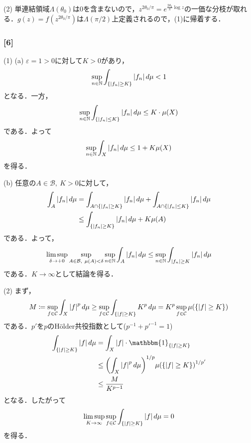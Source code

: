 \documentclass[a4j]{ltjsarticle}
\newcommand{\Nset}{\mathbb{N}}
\newcommand{\1}{\mathbbm{1}}
\numberwithin{equation}{section}
\theoremstyle{definition}
\begin{document}
(2) 単連結領域$\Lambda(\theta_0)$は$0$を含まないので，$z^{2\theta_0/\pi}=e^{\frac{2\theta_0}{\pi}\log z}$の一価な分枝が取れる．$g(z)=f(z^{2\theta_0/\pi})$は$\Lambda(\pi/2)$上定義されるので，(1)に帰着する．
\subsubsection*{[6]}
(1) (a) $\varepsilon=1>0$に対して$K>0$があり，
\begin{equation}
    \sup_{n\in\Nset}\int_{\qty{\abs{f_n}\geq K}}\abs{f_n}\,d\mu<1
\end{equation}
となる．一方，
\begin{equation}
    \sup_{n\in\Nset}\int_{\qty{\abs{f_n}\leq K}}\abs{f_n}\,d\mu\leq K\cdot\mu(X)
\end{equation}
である．よって
\begin{equation}
    \sup_{n\in\Nset}\int_{X}\abs{f_n}\,d\mu\leq 1+K\mu(X)
\end{equation}
を得る．

(b) 任意の$A\in\mathcal{B},\ K>0$に対して，
\begin{align}
    \int_{A}\abs{f_n}\,d\mu&=\int_{A\cap \qty{\abs{f_n}\geq K}}\abs{f_n}\,d\mu+\int_{A\cap\qty{\abs{f_n}\leq K}}\abs{f_n}\,d\mu\\
    &\leq \int_{\qty{\abs{f_n}\geq K}}\abs{f_n}\,d\mu+K\mu(A)
\end{align}
である．よって，
\begin{equation}
    \limsup_{\delta\to+0}\sup_{A\in\mathcal{B},\ \mu(A)<\delta}\sup_{n\in\Nset}\int_{A}\abs{f_n}\,d\mu\leq \sup_{n\in\Nset}\int_{\abs{f_n}\geq K}\abs{f_n}\,d\mu 
\end{equation}
である．$K\to\infty$として結論を得る．

(2) まず，
\begin{equation}
    M\coloneq \sup_{f\in\mathcal{C}}\int_{X}\abs{f}^p\,d\mu\geq \sup_{f\in\mathcal{C} }\int_{\qty{\abs{f}\geq K}}K^p\,d\mu=K^p\sup_{f\in \mathcal{C}}\mu(\qty{\abs{f}\geq K})
\end{equation}
である．$p'$を$p$のHölder共役指数として($p^{-1}+p'^{-1}=1$)
\begin{align}
    \int_{\qty{\abs{f}\geq K}}\abs{f}\,d\mu&=\int_{X}\abs{f}\cdot \1_{\qty{\abs{f}\geq K}}\\
    &\leq \qty(\int_{X}\abs{f}^p\,d\mu)^{1/p}\mu\qty(\qty{\abs{f}\geq K})^{1/p'}\\
    &\leq \frac{M}{K^{p-1}}
\end{align}
となる．したがって
\begin{equation}
    \limsup_{K\to\infty}\sup_{f\in \mathcal{C}}\int_{\qty{\abs{f}\geq K}}\abs{f}\,d\mu=0
\end{equation}
を得る．
\end{document}
